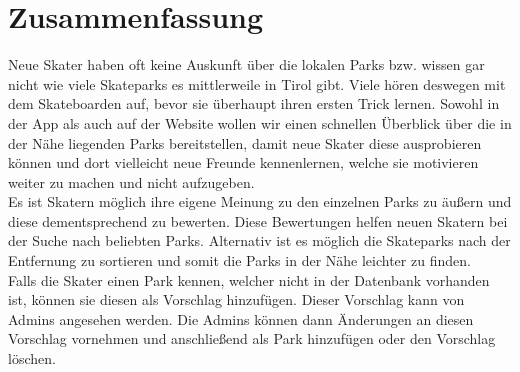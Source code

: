 \section*{Zusammenfassung}

Neue Skater haben oft keine Auskunft über die lokalen Parks bzw. wissen gar nicht wie viele
Skateparks es mittlerweile in Tirol gibt. Viele hören deswegen mit dem Skateboarden auf, bevor sie 
überhaupt ihren ersten Trick lernen. Sowohl in der App als auch auf der Website wollen wir einen 
schnellen Überblick über die in der Nähe liegenden Parks bereitstellen, damit neue Skater diese
ausprobieren können und dort vielleicht neue Freunde kennenlernen, welche sie motivieren weiter zu 
machen und nicht aufzugeben.\\


Es ist Skatern möglich ihre eigene Meinung zu den einzelnen Parks zu äußern und diese dementsprechend 
zu bewerten. Diese Bewertungen helfen neuen Skatern bei der Suche nach beliebten Parks. 
Alternativ ist es möglich die Skateparks nach der Entfernung zu sortieren und somit die Parks in 
der Nähe leichter zu finden. \\


Falls die Skater einen Park kennen, welcher nicht in der Datenbank vorhanden ist, können 
sie diesen als Vorschlag hinzufügen. Dieser Vorschlag kann von Admins angesehen werden. Die Admins 
können dann Änderungen an diesen Vorschlag vornehmen und anschließend als Park hinzufügen oder den
Vorschlag löschen.\\
\newpage